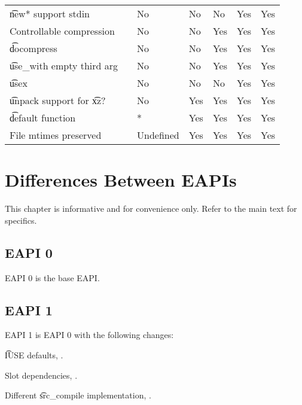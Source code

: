 \begin{landscape}
\begin{longtable}{llP{7.5em}P{7.5em}P{7.5em}P{7.5em}P{7.5em}}
\t{new*} support stdin &  &
    No & No & No & Yes & Yes \\

Controllable compression &  &
    No & No & Yes & Yes & Yes \\

\t{docompress} &  &
    No & No & Yes & Yes & Yes \\

\t{use\_with} empty third arg &  &
    No & No & Yes & Yes & Yes \\

\t{usex} &  &
    No & No & No & Yes & Yes \\

\t{unpack} support for \t{xz}? &  &
    No & Yes & Yes & Yes & Yes \\

\t{default} function &  &
    * & Yes & Yes & Yes & Yes \\

File mtimes preserved &  &
    Undefined & Yes & Yes & Yes & Yes \\

\end{longtable}
\end{landscape}

\chapter{Differences Between EAPIs}

\note This chapter is informative and for convenience only. Refer to the main text for specifics.

\section*{EAPI 0}

EAPI 0 is the base EAPI.

\section*{EAPI 1}

EAPI 1 is EAPI 0 with the following changes:

\begin{compactitem}
\item \t{IUSE} defaults, .
\item Slot dependencies, .
\item Different \t{src\_compile} implementation, .
\end{compactitem}

